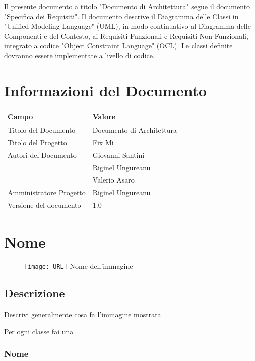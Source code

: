 \documentclass{report}
\begin{document}
	Il presente documento a titolo "Documento di Architettura" segue il documento "Specifica dei Requisiti". Il documento descrive il Diagramma delle Classi in "Unified Modeling Language" (UML), in modo continuativo al Diagramma delle Componenti e del Contesto, ai Requisiti Funzionali e Requisiti Non Funzionali, integrato a codice "Object Constraint Language" (OCL). Le classi definite dovranno essere implementate a livello di codice.
	
	
	\section{Informazioni del Documento}
	
	\begin{center} %
		\centering
		\begin{tabular}{ |p{4cm}|p{4cm}|  }
			\hline
			\centering Campo & \qquad\qquad Valore \\ %
			\hline
			Titolo del Documento & Documento di Architettura \\
			\hline
			Titolo del Progetto & Fix Mi \\
			\hline
			Autori del Documento &
			Giovanni Santini \\ & Riginel Ungureanu \\ & Valerio Asaro \\
			\hline
			Amministratore Progetto & Riginel Ungureanu\\
			\hline
			Versione del documento & 1.0 \\
			\hline
		\end{tabular}
	\end{center}
	


\iffalse
\section{Nome}
\begin{figure}[H]
	\centering\texttt{[image: URL]}
	Nome dell'immagine
\end{figure}
\subsection*{Descrizione}
Descrivi generalmente cosa fa l'immagine mostrata

Per ogni classe fai una
\subsubsection{Nome}
\end{document}
